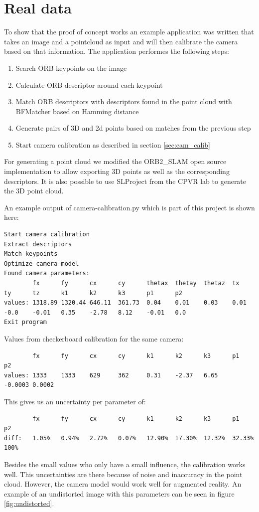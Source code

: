 \documentclass[11pt,a4paper,titlepage,oneside]{report}
\begin{document}
\section{Real data}
To show that the proof of concept works an example application was written that takes an image and a pointcloud as input and will then calibrate the camera based on that information. The application performes the following steps:
\begin{enumerate}
	\item Search ORB keypoints on the image
	\item Calculate ORB descriptor around each keypoint
	\item Match ORB descriptors with descriptors found in the point cloud with BFMatcher \cite{BFMatcher} based on Hamming distance
	\item Generate pairs of 3D and 2d points based on matches from the previous step
	\item Start camera calibration as described in section \ref{sec:cam_calib}
\end{enumerate}
For generating a point cloud we modified the ORB2\_SLAM open source implementation \cite{orbslam2_impl} to allow exporting 3D points as well as the corresponding descriptors. It is also possible to use SLProject from the CPVR lab to generate the 3D point cloud.

An example output of camera-calibration.py which is part of this project is shown here:
\tiny
\begin{lstlisting}
Start camera calibration
Extract descriptors
Match keypoints
Optimize camera model
Found camera parameters:
        fx      fy      cx      cy      thetax  thetay  thetaz  tx      ty      tz      k1      k2      k3      p1      p2
values: 1318.89 1320.44 646.11  361.73  0.04    0.01    0.03    0.01    -0.0    -0.01   0.35    -2.78   8.12    -0.01   0.0
Exit program
\end{lstlisting}
Values from checkerboard calibration for the same camera:
\begin{lstlisting}
        fx      fy      cx      cy      k1      k2      k3      p1      p2
values: 1333    1333    629     362     0.31    -2.37   6.65    -0.0003 0.0002
\end{lstlisting}
This gives us an uncertainty per parameter of:
\begin{lstlisting}
        fx      fy      cx      cy      k1      k2      k3      p1      p2
diff:   1.05%   0.94%   2.72%   0.07%   12.90%  17.30%  12.32%  32.33% 100%
\end{lstlisting}
\normalsize
Besides the small values who only have a small influence, the calibration works well. This uncertainties are there because of noise and inaccuracy in the point cloud. However, the camera model would work well for augmented reality. An example of an undistorted image with this parameters can be seen in figure \ref{fig:undistorted}.
\end{document}
